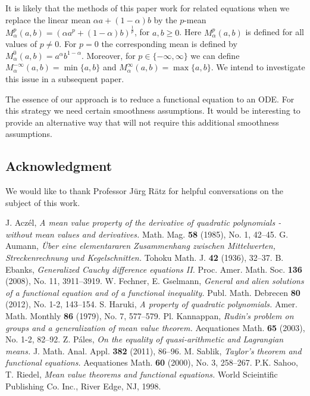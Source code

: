 \documentclass{birkjour}
\begin{document}
\medskip 

It is likely that the methods of this paper work for related equations when we replace the linear mean $\alpha a + (1-\alpha) b$ by the $p$-mean $M^p_\alpha(a,b) = (\alpha a^p + (1-\alpha) b)^{\frac{1}{p}}$, for $a,b \geq 0$. Here $M^p_\alpha(a,b)$ is defined for all 
values of $ p \neq 0$. For $p=0$ the corresponding mean is defined by $M^0_\alpha(a,b) = a^\alpha b^{1-\alpha}$. Moreover, for $p \in \{ -\infty, \infty \}$ we can define $M^{-\infty}_\alpha(a,b)= \min \{ a, b \}$ and  $M^{\infty}_\alpha(a,b)= \max \{ a, b \}$. We intend to investigate this issue in a subsequent paper. 

\medskip

The essence of our approach is to reduce a functional equation to an ODE. For this strategy we need certain smoothness assumptions. It would be interesting to provide an alternative way that will not require this additional smoothness assumptions.  

\subsection*{Acknowledgment}
We would like to thank Professor J\"urg R\"atz for helpful conversations on the subject of this work.   

\begin{thebibliography}{1}
J. Acz{\'e}l, \textit{A mean value property of the derivative of quadratic polynomials - without mean values and derivatives.} Math. Mag. \textbf{58} (1985), No. 1, 42--45. 
G. Aumann, \textit{\"Uber eine elementararen Zusammenhang zwischen Mittelwerten, Streckenrechnung und Kegelschnitten.} Tohoku Math. J. \textbf{42} (1936), 32--37.
B. Ebanks, \textit{Generalized Cauchy difference equations II.} Proc. Amer. Math. Soc. \textbf{136} (2008), No. 11, 3911--3919.
W. Fechner, E. Gselmann, \textit{General and alien solutions of a functional equation and of a functional inequality.} Publ. Math. Debrecen \textbf{80} (2012), No. 1-2, 143--154.
S. Haruki, \textit{A property of quadratic polynomials.} Amer. Math. Monthly \textbf{86} (1979), No. 7, 577--579. 
Pl. Kannappan, \textit{Rudin's problem on groups and a generalization of mean value theorem.} Aequationes Math. \textbf{65} (2003), No. 1-2, 82--92. 
Z. P{\'a}les, \textit{On the equality of quasi-arithmetic and Lagrangian means.} J. Math. Anal. Appl. \textbf{382} (2011), 86--96.
M. Sablik, \textit{Taylor's theorem and functional equations.} Aequationes Math. \textbf{60} (2000), No. 3, 258--267. 
P.K. Sahoo, T. Riedel, \textit{Mean value theorems and functional equations.}  World Scieintific Publishing Co. Inc., River Edge, NJ, 1998.

\end{thebibliography}
\end{document}
